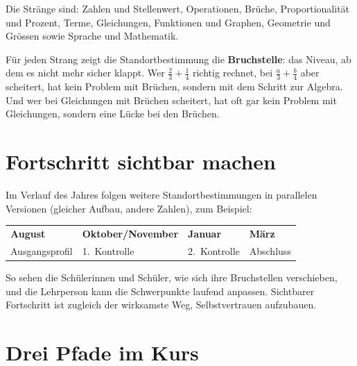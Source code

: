 \documentclass[11pt,a4paper]{article}
\begin{document}
Die Stränge sind: Zahlen und Stellenwert, Operationen, Brüche,
Proportionalität und Prozent, Terme, Gleichungen, Funktionen und Graphen,
Geometrie und Grössen sowie Sprache und Mathematik.

Für jeden Strang zeigt die Standortbestimmung die \textbf{Bruchstelle}: das
Niveau, ab dem es nicht mehr sicher klappt. Wer $\frac{2}{3} + \frac{1}{4}$
richtig rechnet, bei $\frac{a}{3} + \frac{b}{4}$ aber scheitert, hat kein
Problem mit Brüchen, sondern mit dem Schritt zur Algebra. Und wer bei
Gleichungen mit Brüchen scheitert, hat oft gar kein Problem mit Gleichungen,
sondern eine Lücke bei den Brüchen.

\section{Fortschritt sichtbar machen}

Im Verlauf des Jahres folgen weitere Standortbestimmungen in parallelen
Versionen (gleicher Aufbau, andere Zahlen), zum Beispiel:

\begin{center}
\begin{tabular}{llll}
  \textbf{August} & \textbf{Oktober/November} & \textbf{Januar} & \textbf{März} \\
  Ausgangsprofil & 1.\ Kontrolle & 2.\ Kontrolle & Abschluss
\end{tabular}
\end{center}

So sehen die Schülerinnen und Schüler, wie sich ihre Bruchstellen
verschieben, und die Lehrperson kann die Schwerpunkte laufend anpassen.
Sichtbarer Fortschritt ist zugleich der wirksamste Weg, Selbstvertrauen
aufzubauen.

\section{Drei Pfade im Kurs}
\end{document}
